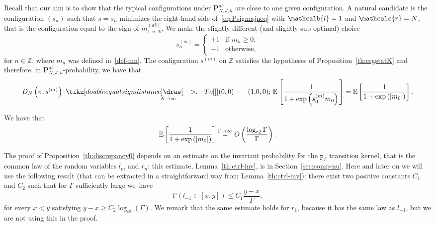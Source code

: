 \documentclass[AHL,Unicode,longabstracts,published]{cedram}
\newlength{\LETTERheight}
\newcommand*{\longto}[1]{\ %
{\tikz[double equal sign distance] \draw [->,-{To[]}] (0,0) -- (#1,0);}\ }
\newcommand{\pp}{\mathtt{p}_\gG}
\newcommand{\bP}{\mathbf{P}}
\newcommand{\bbE}{\mathbb{E}}
\newcommand{\bbP}{\mathbb{P}}
\newcommand{\bbZ}{\mathbb{Z}}
\newcommand{\gG}{\Gamma}
\newcommand{\loglog}{\log_{\circ 2}}
\renewcommand{\ell}{\mathcalb{l}}
\newcommand{\err}{\mathcalc{r}}
\renewcommand*{\to}{\mathchoice{\longrightarrow}{\rightarrow}{\rightarrow}{\rightarrow}}
\begin{document}
Recall that our aim is to show that the typical configurations under $\bP_{N, J, h}^{ab}$ are close to one given configuration. A natural candidate is the configuration $(s_n)$ such that $s=s_n$ minimizes the right-hand side of~\eqref{eq:Psigmajneq} with $\ell=1$ and $\err=N$, that is the configuration equal to the sign of $m^{(ab)}_{1, n, N}$. We make the slightly different (and slightly sub-optimal) choice
\begin{equation}\label{eq:defsm}
s^{(m)}_n=
\begin{cases}
+1 &\text{if } m_n\ge 0,\\ 
-1 &\text{otherwise,}
\end{cases}
\end{equation}
for $n\in \bbZ$, where $m_n$ was defined in~\eqref{def-mn}. The configuration $s^{(m)}$ on $\bbZ$ satisfies the hypotheses of Proposition~\ref{th:ergstatK} and therefore, in $\bP_{N, J, h}^{ab}$-probability, we have that
\begin{equation}\label{eq:discrepgssm}
D_N\left(\sigma, s^{(m)}\right) \underset{N\to \infty}{\longto{1.0}} \bbE\left[\frac1{1+\exp\left(s^{(m)}_0 m_0\right)}\right]=\bbE\left[\frac1{1+\exp\left(|m_0|\right)}\right].
\end{equation}

\begin{prop}\label{th:discrepancy0}
We have that
\begin{equation}\label{eq:discrepancy0}
\bbE\left[\frac1{1+\exp\left(|m_0|\right)}\right]\overset{\gG \to \infty} = O \left(\frac{\loglog \gG}{\gG} \right).
\end{equation}
\end{prop}


The proof of Proposition~\ref{th:discrepancy0} depends on an estimate on the invariant probability for the $\pp$ transition kernel, that is the common law of the random variables $l_m$ and $r_n$: this estimate, Lemma~\ref{th:ctrl-inv}, is in Section~\ref{sec:comp-nu}. Here and later on we will use the following result (that can be extracted in a straightforward way from Lemma~\ref{th:ctrl-inv}): there exist two positive constants $C_1$ and $C_2$ such that for $\gG$ sufficiently large we~have
\begin{equation}\label{eq:fctrl-inv}
\bbP (l_{-1} \in [x, y])\le C_1 \frac{y-x}\gG,
\end{equation}
for every $x<y$ satisfying $y-x \ge C_2 \loglog (\gG)$. We remark that the same estimate holds for $r_{1}$, because it has the same law as $l_{-1}$, but we are not using this in the proof.
\end{document}
